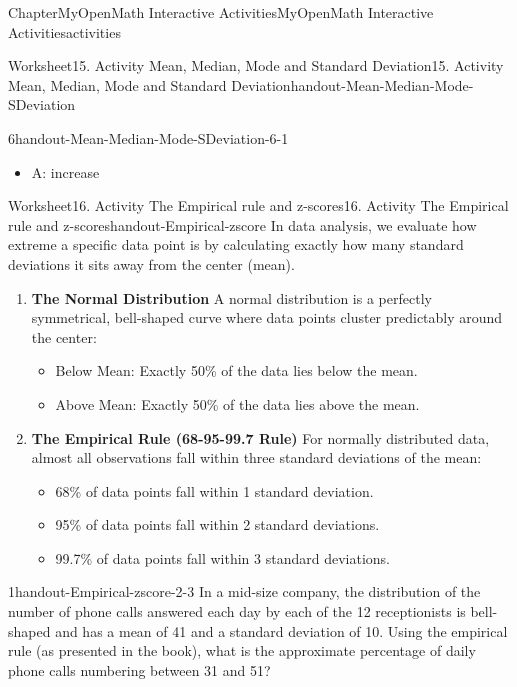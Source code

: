 \documentclass[oneside,10pt,]{book}
\newcommand{\ptxlistdisc}{\raisebox{0.3ex}{\textbullet}}
\newcommand{\terminology}[1]{\textbf{#1}}
\begin{document}
\begin{chapterptx}{Chapter}{MyOpenMath Interactive Activities}{}{MyOpenMath Interactive Activities}{}{}{activities}
\begin{worksheet-section}{Worksheet}{15. Activity Mean, Median, Mode and Standard Deviation}{}{15. Activity Mean, Median, Mode and Standard Deviation}{}{}{handout-Mean-Median-Mode-SDeviation}
\begin{divisionexercise}{6}{}{}{handout-Mean-Median-Mode-SDeviation-6-1}
\begin{itemize}[label=\ptxlistdisc]
\item{}A: increase%
\end{itemize}
%
\end{divisionexercise}%
\end{worksheet-section}
\restoregeometry
%
%
\typeout{************************************************}
\typeout{************************************************}
%
\begin{worksheet-section}{Worksheet}{16. Activity The Empirical rule and z-scores}{}{16. Activity The Empirical rule and z-scores}{}{}{handout-Empirical-zscore}
In data analysis, we evaluate how extreme a specific data point is by calculating exactly how many standard deviations it sits away from the center (mean).%
%
\begin{enumerate}[label={(\alph*)}]
\item{}\terminology{The Normal Distribution} A normal distribution is a perfectly symmetrical, bell-shaped curve where data points cluster predictably around the center:%
%
\begin{itemize}[label=\ptxlistdisc]
\item{}Below Mean: Exactly 50\% of the data lies below the mean.%
\item{}Above Mean: Exactly 50\% of the data lies above the mean.%
\end{itemize}
\item{}\terminology{The Empirical Rule (68-95-99.7 Rule)} For normally distributed data, almost all observations fall within three standard deviations of the mean:%
%
\begin{itemize}[label=\ptxlistdisc]
\item{}68\% of data points fall within 1 standard deviation.%
\item{}95\% of data points fall within 2 standard deviations.%
\item{}99.7\% of data points fall within 3 standard deviations.%
\end{itemize}
\end{enumerate}
\begin{divisionexercise}{1}{}{}{handout-Empirical-zscore-2-3}%
In a mid-size company, the distribution of the number of phone calls answered each day by each of the 12 receptionists is bell-shaped and has a mean of 41 and a standard deviation of 10. Using the empirical rule (as presented in the book), what is the approximate percentage of daily phone calls numbering between 31 and 51?%

\end{divisionexercise}
\end{worksheet-section}
\end{chapterptx}
\end{document}
